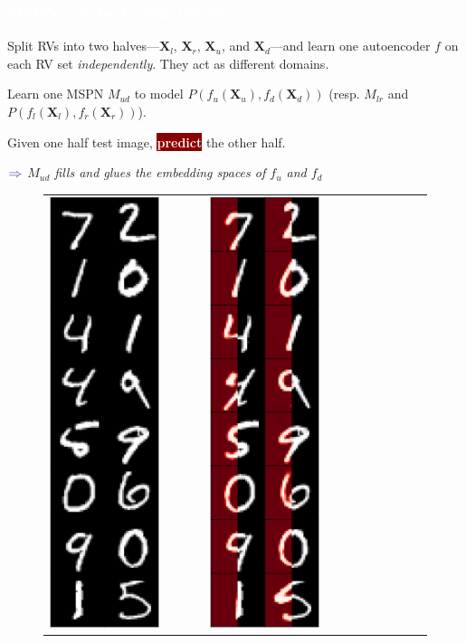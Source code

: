 \documentclass[xcolor={usenames,dvipsnames,svgnames}, compress]{beamer}
\newcommand{\highlighttext}[2][yellow]{{\colorbox{#1}{\textcolor{white}{#2}}}}
\begin{document}
\begin{frame}[t]
  \frametitle{\highlighttext[peas5]{MSPNs: orchestrating inference}}
  \footnotesize

  
  Split RVs into two halves---$\mathbf{X}_{l}$, $\mathbf{X}_{r}$,
  $\mathbf{X}_{u}$,  and
  $\mathbf{X}_{d}$---and learn one autoencoder $f$ on each RV set
  \emph{independently}.
  They act as different domains.\par\bigskip
  Learn one MSPN $M_{ud}$ to model $P(f_{u}(\mathbf{X}_{u}),
  f_{d}(\mathbf{X}_{d}))$ (resp. $M_{lr}$ and $P(f_{l}(\mathbf{X}_{l}), f_{r}(\mathbf{X}_{r}))$).

  Given one half test image, \highlighttext[darkred]{\textbf{predict}}
  the other half.
  \begin{minipage}{1.0\linewidth}
  \vspace{5pt}
      \raggedleft
      $\color{violet}\boldsymbol\Rightarrow$
      \scriptsize
 \emph{$M_{ud}$ fills and glues the embedding spaces of $f_{u}$ and $f_{d}$}
\end{minipage}
  \begin{figure}[t]
\begin{minipage}{0.6\linewidth}
\vspace{0pt}
    \setlength{\tabcolsep}{-0.1pt}
    \begin{tabular}{rrrrrrrrr}
    \includegraphics[width=0.14\columnwidth]{figures/orig-16-crop}&$\quad\quad$&
    \includegraphics[width=0.14\columnwidth]{figures/dec-left-16-crop}&$\quad\quad$&

\end{tabular}
\end{minipage}
\end{figure}
\end{frame}
\end{document}
